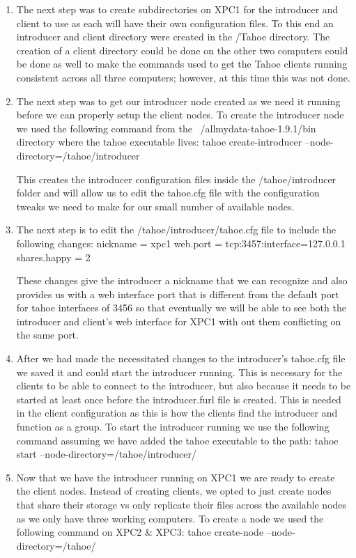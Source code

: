 \documentclass[11pt]{article}
\begin{document}
\begin{enumerate}
\item The next step was to create subdirectories on XPC1 for the introducer and client to use as each will have their own configuration files. To this end an introducer and client directory were created in the /Tahoe directory. The creation of a client directory could be done on the other two computers could be done as well to make the commands used to get the Tahoe clients running consistent across all three computers; however, at this time this was not done. 
\item The next step was to get our introducer node created as we need it running before we can properly setup the client nodes. To create the introducer node we used the following command from the ~/allmydata-tahoe-1.9.1/bin directory where the tahoe executable lives:
\subitem tahoe create-introducer --node-directory=/tahoe/introducer

This creates the introducer configuration files inside the /tahoe/introducer folder and will allow us to edit the tahoe.cfg file with the configuration tweaks we need to make for our small number of available nodes. 
\item The next step is to edit the /tahoe/introducer/tahoe.cfg file to include the following changes:
\subitem nickname = xpc1
\subitem web.port = tcp:3457:interface=127.0.0.1
\subitem shares.happy = 2

These changes give the introducer a nickname that we can recognize and also provides us with a web interface port that is different from the default port for tahoe interfaces of 3456 so that eventually we will be able to see both the introducer and client's web interface for XPC1 with out them conflicting on the same port.

\item After we had made the necessitated changes to the introducer's tahoe.cfg file we saved it and could start the introducer running. This is necessary for the clients to be able to connect to the introducer, but also because it needs to be started at least once before the introducer.furl file is created. This is needed in the client configuration as this is how the clients find the introducer and function as a group. To start the introducer running we use the following command assuming we have added the tahoe executable to the path:
\subitem tahoe start --node-directory=/tahoe/introducer/

\item Now that we have the introducer running on XPC1 we are ready to create the client nodes. Instead of creating clients, we opted to just create nodes that share their storage vs only replicate their files across the available nodes as we only have three working computers. To create a node we used the following command on XPC2 \& XPC3:
\subitem tahoe create-node --node-directory=/tahoe/


\end{enumerate}
\end{document}
